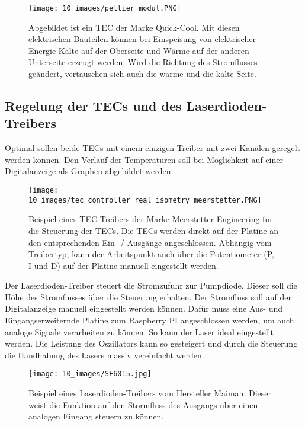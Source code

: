 \documentclass[a4paper,10pt]{scrartcl}
\begin{document}

\begin{figure}[H]
    \centering
    \texttt{[image: 10\_images/peltier\_modul.PNG]}
    \caption{Abgebildet ist ein TEC der Marke Quick-Cool. Mit diesen elektrischen Bauteilen können bei Einspeisung von elektrischer Energie Kälte auf der Oberseite und Wärme auf der anderen Unterseite erzeugt werden. Wird die Richtung des Stromflusses geändert, vertauschen sich auch die warme und die kalte Seite.}
    \label{fig:peltierelement}
\end{figure}

\subsection{Regelung der TECs und des Laserdioden-Treibers}
Optimal sollen beide TECs mit einem einzigen Treiber mit zwei Kanälen geregelt werden können. Den Verlauf der Temperaturen soll bei Möglichkeit auf einer Digitalanzeige als Graphen abgebildet werden.

\begin{figure}[H]
    \centering
    \texttt{[image: 10\_images/tec\_controller\_real\_isometry\_meerstetter.PNG]}
    \caption{Beispiel eines TEC-Treibers der Marke Meerstetter Engineering für die Steuerung der TECs. Die TECs werden direkt auf der Platine an den entsprechenden Ein- / Ausgänge angeschlossen. Abhängig vom Treibertyp, kann der Arbeitspunkt auch über die Potentiometer (P, I und D) auf der Platine manuell eingestellt werden.}
    \label{fig:tec_controller_free}
\end{figure}

Der Laserdioden-Treiber steuert die Stromzufuhr zur Pumpdiode. Dieser soll die Höhe des Stromflusses über die Steuerung erhalten. Der Stromfluss soll auf der Digitalanzeige manuell eingestellt werden können. Dafür muss eine Aus- und Eingangserweiternde Platine zum Raspberry PI angeschlossen werden, um auch analoge Signale verarbeiten zu können.
So kann der Laser ideal eingestellt werden. Die Leistung des Oszillators kann so gesteigert und durch die Steuerung die Handhabung des Lasers massiv vereinfacht werden.

\begin{figure}[H]
    \centering
    \texttt{[image: 10\_images/SF6015.jpg]}
    \caption{Beispiel eines Laserdioden-Treibers vom Hersteller Maiman. Dieser weist die Funktion auf den Stormfluss des Ausgangs über einen analogen Eingang steuern zu können.}
    \label{fig:ldd}
\end{figure}
\end{document}

